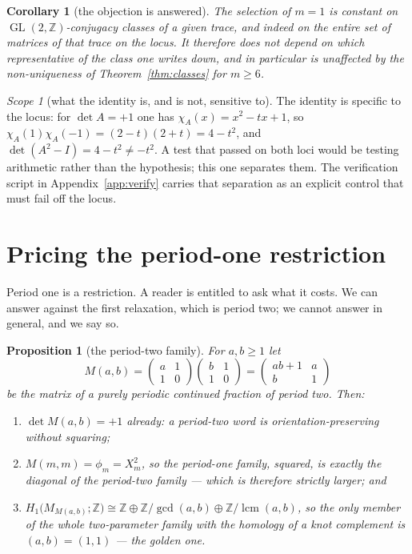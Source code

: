 \documentclass[11pt,a4paper]{article}
\newtheorem{proposition}[theorem]{Proposition}
\newtheorem{corollary}[theorem]{Corollary}
\theoremstyle{definition}
\theoremstyle{remark}
\newtheorem{scope}[theorem]{Scope}
\newcommand{\GL}{\operatorname{GL}}
\newcommand{\Z}{\mathbb{Z}}
\newcommand{\lcm}{\operatorname{lcm}}
\begin{document}
\begin{corollary}[the objection is answered]\label{cor:survives}
The selection of $m=1$ is constant on $\GL(2,\Z)$-conjugacy classes of a given trace, and
indeed on the entire set of matrices of that trace on the locus. It therefore does not depend
on which representative of the class one writes down, and in particular is unaffected by the
non-uniqueness of Theorem~\ref{thm:classes} for $m\ge6$.
\end{corollary}

\begin{scope}[what the identity is, and is not, sensitive to]\label{sc:control}
The identity is specific to the locus: for $\det A=+1$ one has $\chi_A(x)=x^2-tx+1$, so
$\chi_A(1)\chi_A(-1)=(2-t)(2+t)=4-t^2$, and $\det(A^2-I)=4-t^2\ne-t^2$. A test that passed on
both loci would be testing arithmetic rather than the hypothesis; this one separates them. The
verification script in Appendix~\ref{app:verify} carries that separation as an explicit control
that must fail off the locus.
\end{scope}

\section{Pricing the period-one restriction}\label{sec:price}

Period one is a restriction. A reader is entitled to ask what it costs. We can answer against
the first relaxation, which is period two; we cannot answer in general, and we say so.

\begin{proposition}[the period-two family]\label{prop:periodtwo}
For $a,b\ge1$ let
\[
   M(a,b)=\begin{pmatrix}a&1\\1&0\end{pmatrix}\begin{pmatrix}b&1\\1&0\end{pmatrix}
         =\begin{pmatrix}ab+1&a\\b&1\end{pmatrix}
\]
be the matrix of a purely periodic continued fraction of period two. Then:
\begin{enumerate}[label=\textup{(\roman*)},leftmargin=2.4em]
\item $\det M(a,b)=+1$ \emph{already}: a period-two word is orientation-preserving without
      squaring;
\item $M(m,m)=\phi_m=X_m^2$, so the period-one family, squared, is exactly the diagonal of the
      period-two family --- which is therefore strictly larger; and
\item $H_1\bigl(M_{M(a,b)};\Z\bigr)\cong\Z\oplus\Z/\gcd(a,b)\oplus\Z/\lcm(a,b)$, so the only
      member of the whole two-parameter family with the homology of a knot complement is
      $(a,b)=(1,1)$ --- the golden one.
\end{enumerate}
\end{proposition}
\end{document}
